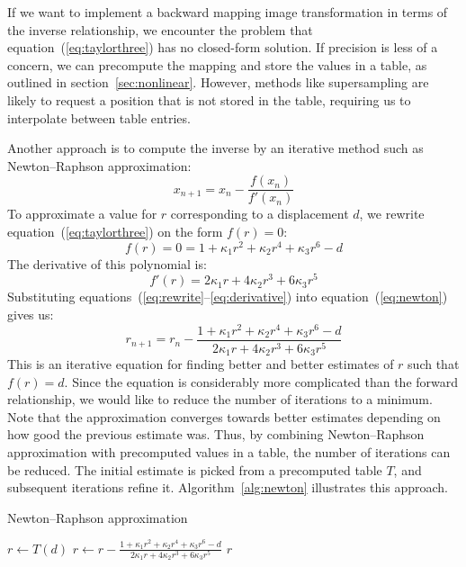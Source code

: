 \documentclass[english,12pt]{ifimaster}
\begin{document}
If we want to implement a backward mapping image transformation in
terms of the inverse relationship, we encounter the problem that
equation~(\ref{eq:taylorthree}) has no closed-form solution. If
precision is less of a concern, we can precompute the mapping and
store the values in a table, as outlined in
section~\ref{sec:nonlinear}. However, methods like supersampling are
likely to request a position that is not stored in the table,
requiring us to interpolate between table entries.

Another approach is to compute the inverse by an iterative method such
as Newton--Raphson approximation:
\begin{equation}
  \label{eq:newton}
  x_{n+1} = x_n - \frac{f(x_n)}{f'(x_n)}
\end{equation}
To approximate a value for $r$ corresponding to a displacement $d$, we
rewrite equation~(\ref{eq:taylorthree}) on the form $f(r) = 0$:
\begin{equation}
  \label{eq:rewrite}
  f(r) = 0 = 1 + \kappa_1r^2 + \kappa_2r^4 + \kappa_3r^6 - d
\end{equation}
The derivative of this polynomial is:
\begin{equation}
  \label{eq:derivative}
  f'(r) = 2\kappa_1r + 4\kappa_2r^3 + 6\kappa_3r^5
\end{equation}
Substituting equations~(\ref{eq:rewrite}--\ref{eq:derivative}) into
equation~(\ref{eq:newton}) gives us:
\begin{equation}
  \label{eq:approximation}
  r_{n+1} = r_n - \frac{1 + \kappa_1r^2 + \kappa_2r^4 + \kappa_3r^6 - d}{2\kappa_1r + 4\kappa_2r^3 + 6\kappa_3r^5}
\end{equation}
This is an iterative equation for finding better and better estimates
of $r$ such that $f(r) = d$. Since the equation is considerably more
complicated than the forward relationship, we would like to reduce the
number of iterations to a minimum. Note that the approximation
converges towards better estimates depending on how good the previous
estimate was. Thus, by combining Newton--Raphson approximation with
precomputed values in a table, the number of iterations can be
reduced. The initial estimate is picked from a precomputed table $T$,
and subsequent iterations refine it. Algorithm~\ref{alg:newton}
illustrates this approach.

\begin{algorithm}[h]
  \caption{Newton--Raphson approximation}
  \label{alg:newton}
  \begin{algorithmic}
    \STATE $r \leftarrow T(d)$ 
    \STATE $r \leftarrow r - \tfrac{1 + \kappa_1r^2 + \kappa_2r^4 +
      \kappa_3r^6 - d}{2\kappa_1r + 4\kappa_2r^3 + 6\kappa_3r^5}$
    \ENDFOR
    \RETURN $r$ 
  \end{algorithmic}
\end{algorithm}
\end{document}
